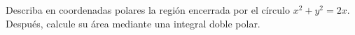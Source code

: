 Describa en coordenadas polares la región encerrada por el círculo $x^2+y^2=2x$. Después, calcule su área mediante una integral doble polar.
